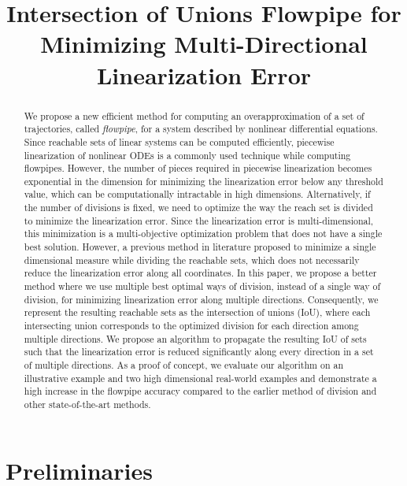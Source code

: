 


\title{Intersection of Unions Flowpipe for Minimizing Multi-Directional Linearization Error}
\author{}
\institute{}
%
    
\maketitle
%
\begin{abstract}
We propose a new efficient method for computing an overapproximation of a set of trajectories, called \emph{flowpipe}, for a system described by
nonlinear differential equations.  Since reachable sets of linear
systems can be computed efficiently, piecewise linearization of
nonlinear ODEs is a commonly used technique while computing flowpipes.  However, the
number of pieces required in piecewise linearization becomes
exponential in the dimension for minimizing the linearization error below
any threshold value, which can be computationally intractable in high
dimensions.  Alternatively, if the number of divisions is fixed, 
we need to optimize the way the reach set is divided to minimize the
linearization error.  Since the linearization error is
multi-dimensional, this minimization is a multi-objective optimization
problem that does not have a single best solution.  
However, a previous method in literature proposed to minimize a single
dimensional measure while dividing the reachable sets, which does not
necessarily reduce the linearization error along all coordinates.  
In this paper, we propose a better method where we use multiple best
optimal ways of division, instead of a single way of division, for
minimizing linearization error along multiple directions.
Consequently, we represent the resulting reachable sets as
the intersection of unions (IoU), where each intersecting union
corresponds to the optimized division for each direction among
multiple directions.  We propose an algorithm to propagate the
resulting IoU of sets such that the linearization error is reduced
significantly along every direction in a set of multiple directions.
As a proof of concept, we evaluate our algorithm on an illustrative example and two high dimensional real-world examples and demonstrate a high increase in the flowpipe accuracy compared to the earlier method of division and other state-of-the-art methods.
\end{abstract}

\section{Preliminaries}


